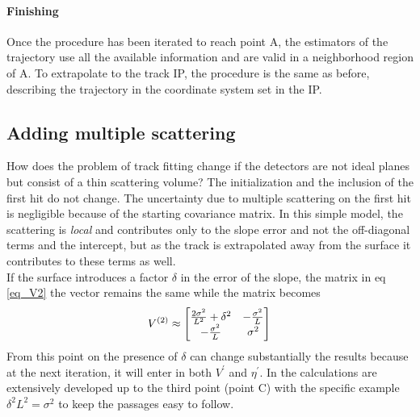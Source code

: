 \paragraph{Finishing} Once the procedure has been iterated  to reach point A, 
the estimators of the trajectory use all the available information and are valid in a neighborhood region of A. 
To extrapolate to the track IP, 
the procedure is the same as before, 
describing the trajectory in the coordinate system set in the IP. 

\subsection{Adding multiple scattering}
How does the problem of track fitting change if the detectors are not ideal planes but consist of a thin scattering volume? 
The initialization and the inclusion of the first hit do not change. 
The uncertainty due to multiple scattering on the first hit is negligible because of the starting covariance matrix. 
In this simple model, the scattering is \textit{local} and contributes only to the slope error and not the off-diagonal terms 
and the intercept, but as the track is extrapolated away from the surface it contributes to these terms as well.\\
If the surface introduces a factor $\delta$ in the error of the slope, 
the matrix in eq \ref{eq_V2} the vector remains the same while the matrix becomes
$$
V^{(2)}\approx
\begin{bmatrix}
\frac{2\sigma^2}{L^2}+\delta^2 & -\frac{\sigma^2}{L} \\
-\frac{\sigma^2}{L} & \sigma^2
\end{bmatrix}\\
$$
From this point on the presence of $\delta$ can change substantially the results because at the next iteration, it will enter in both $V^\prime$ and $\eta^\prime$.
 In \cite{KutschkePaper} the calculations are extensively developed up to the third point (point C) 
 with the specific example $\delta^2L^2=\sigma^2$ to keep the passages easy to follow.

\printbibliography[
    title=Bibliography on Kalman filter
]